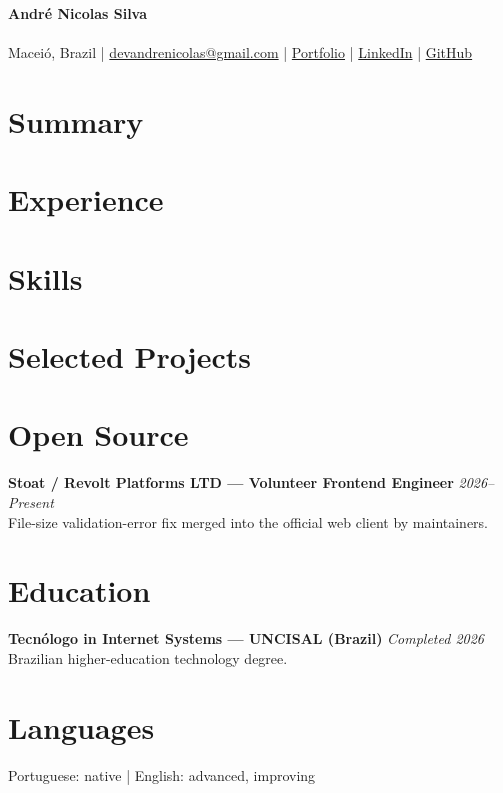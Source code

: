 
\begin{center}
  {\LARGE\textbf{André Nicolas Silva}}\\[0.2em]
  \CvTitle\\[0.25em]
  Maceió, Brazil | \href{mailto:devandrenicolas@gmail.com}{devandrenicolas@gmail.com} | \href{https://portfolio-andrenicolas.vercel.app}{Portfolio} | \href{https://www.linkedin.com/in/devandrenicolas}{LinkedIn} | \href{https://github.com/devAndreNicolas}{GitHub}
\end{center}
\section*{Summary}
\CvSummary
\section*{Experience}
\CvExperience
\section*{Skills}
\CvSkills
\section*{Selected Projects}
\CvProjects
\section*{Open Source}
\textbf{Stoat / Revolt Platforms LTD — Volunteer Frontend Engineer} \hfill \textit{2026--Present}\\
File-size validation-error fix merged into the official web client by maintainers.
\section*{Education}
\textbf{Tecnólogo in Internet Systems — UNCISAL (Brazil)} \hfill \textit{Completed 2026}\\
Brazilian higher-education technology degree.
\section*{Languages}
Portuguese: native | English: advanced, improving


